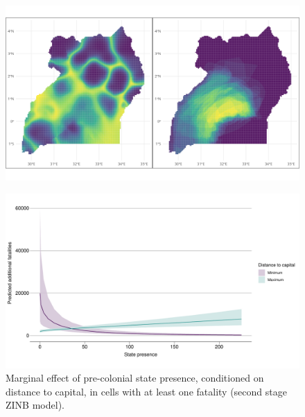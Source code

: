 \documentclass{beamer}
\begin{document}

\begin{frame} %
	\begin{figure}
		\includegraphics[width=1\linewidth]{img/ugaplots.png}
	\end{figure}
\end{frame}


\begin{frame}
\end{frame}


\begin{frame} %
	\begin{figure}
		\includegraphics[width=\linewidth]{"../R/Output/interdeathszinbplot.pdf"}
		\caption{Marginal effect of pre-colonial state presence, conditioned on
		distance to capital, in cells with at least one fatality (second stage
		ZINB model).}
	\end{figure}
\end{frame}
\end{document}
